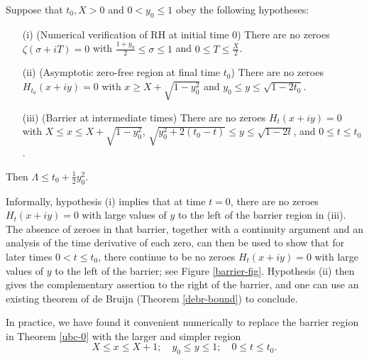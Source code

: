 \begin{theorem}\label{ubc-0}  Suppose that $t_0, X > 0$ and $0 < y_0 \leq 1$ obey the following hypotheses:
\begin{itemize}
\item[(i)]  (Numerical verification of RH at initial time $0$) There are no zeroes $\zeta(\sigma+iT) = 0$ with $\frac{1+y_0}{2} \leq \sigma \leq 1$ and $0 \leq T \leq \frac{X}{2}$.
\item[(ii)]  (Asymptotic zero-free region at final time $t_0$) There are no zeroes $H_{t_0}(x+iy)=0$ with $x \geq X+\sqrt{1-y_0^2}$ and $y_0 \leq y \leq \sqrt{1-2t_0}$.
\item[(iii)]  (Barrier at intermediate times) There are no zeroes $H_{t}(x+iy)=0$ with $X \leq x \leq X+\sqrt{1-y_0^2}$, $\sqrt{y_0^2+2(t_0-t)} \leq y \leq \sqrt{1-2t}$, and $0 \leq t \leq t_0$.
\end{itemize}
Then $\Lambda \leq t_0 + \frac{1}{2} y_0^2$.
\end{theorem}

Informally, hypothesis (i) implies that at time $t=0$, there are no zeroes $H_t(x+iy)=0$ with large values of $y$ to the left of the barrier region in (iii).  The absence of zeroes in that barrier, together with a continuity argument and an analysis of the time derivative of each zero, can then be used to show that for later times $0 < t \leq t_0$, there continue to be no zeroes $H_t(x+iy)=0$ with large values of $y$ to the left of the barrier; see Figure \ref{barrier-fig}.  Hypothesis (ii) then gives the complementary assertion to the right of the barrier, and one can use an existing theorem of de Bruijn (Theorem \ref{debr-bound}) to conclude.

In practice, we have found it convenient numerically to replace the barrier region in Theorem \ref{ubc-0} with the larger and simpler region
$$ X \leq x \leq X+1; \quad y_0 \leq y \leq 1; \quad 0 \leq t \leq t_0.$$

